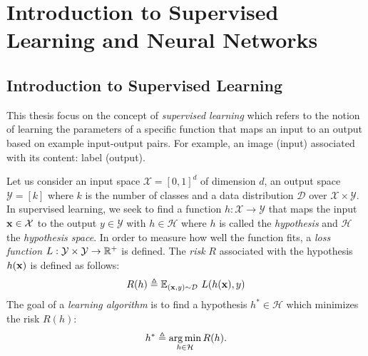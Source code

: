 \section{Introduction to Supervised Learning and Neural Networks}
\label{secction:ch2-supervised_learning_neural_networks}


\subsection{Introduction to Supervised Learning}
\label{subsection:ch1-introduction_to_supervised_learning}

This thesis focus on the concept of \emph{supervised learning} which refers to the notion of learning the parameters of a specific function that maps an input to an output based on example input-output pairs.
For example, an image (input) associated with its content: label (output).

Let us consider an input space $\mathcal{X} = [0, 1]^d$ of dimension $d$, an output space $\mathcal{Y} = [k]$ where $k$ is the number of classes and a data distribution $\mathcal{D}$ over $\mathcal{X} \times \mathcal{Y}$.
In supervised learning, we seek to find a function $h: \mathcal{X} \rightarrow \mathcal{Y}$ that maps the input $\mathbf{x} \in \mathcal{X}$ to the output $y \in \mathcal{Y}$ with $h \in \mathcal{H}$ where $h$ is called the \emph{hypothesis} and $\mathcal{H}$ the \emph{hypothesis space}.
In order to measure how well the function fits, a \emph{loss function} $L: \mathcal{Y} \times \mathcal{Y} \rightarrow \mathbb{R}^{+}$ is defined.
The \emph{risk} $R$ associated with the hypothesis $h(\mathbf{x})$ is defined as follows:
\begin{equation}
  R(h) \triangleq \Ebb_{(\xvec, y) \sim \mathcal{D}}\  L \left( h(\xvec), y \right)
\end{equation}
The goal of a \emph{learning algorithm} is to find a hypothesis $h^* \in \mathcal{H}$ which minimizes the risk $R(h)$:
\begin{equation}
  h^* \triangleq \operatorname*{arg\,min}_{h \in \mathcal{H}} R(h) .
\end{equation}

